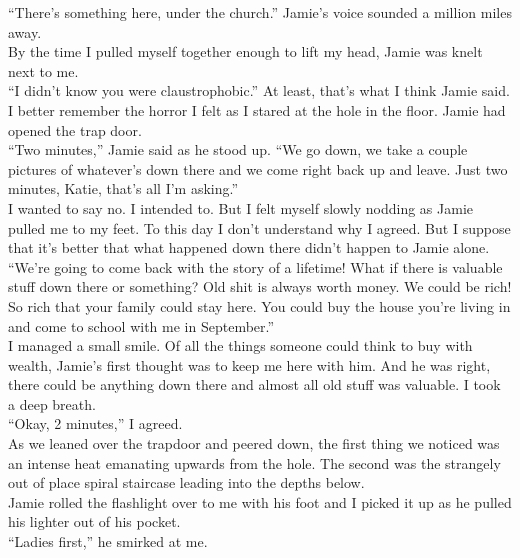 \documentclass[a5paper]{scrartcl}
\begin{document}
\enquote{There's something here, under the church.} Jamie's voice sounded a million miles away.\\


By the time I pulled myself together enough to lift my head, Jamie was knelt next to me.\\


\enquote{I didn't know you were claustrophobic.} At least, that's what I think Jamie said. I better remember the horror I felt as I stared at the hole in the floor. Jamie had opened the trap door.\\


\enquote{Two minutes,} Jamie said as he stood up. \enquote{We go down, we take a couple pictures of whatever's down there and we come right back up and leave. Just two minutes, Katie, that's all I'm asking.}\\


I wanted to say no. I intended to. But I felt myself slowly nodding as Jamie pulled me to my feet. To this day I don't understand why I agreed. But I suppose that it's better that what happened down there didn't happen to Jamie alone.\\


\enquote{We're going to come back with the story of a lifetime! What if there is valuable stuff down there or something? Old shit is always worth money. We could be rich! So rich that your family could stay here. You could buy the house you're living in and come to school with me in September.}\\


I managed a small smile. Of all the things someone could think to buy with wealth, Jamie's first thought was to keep me here with him. And he was right, there could be anything down there and almost all old stuff was valuable. I took a deep breath.\\


\enquote{Okay, 2 minutes,} I agreed.\\


As we leaned over the trapdoor and peered down, the first thing we noticed was an intense heat emanating upwards from the hole. The second was the strangely out of place spiral staircase leading into the depths below. \\


Jamie rolled the flashlight over to me with his foot and I picked it up as he pulled his lighter out of his pocket.\\


\enquote{Ladies first,} he smirked at me.\\
\end{document}
